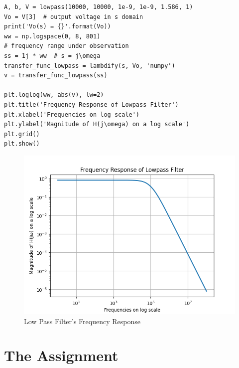 \documentclass[11pt, a4paper]{article}
\begin{document}
\begin{verbatim}
A, b, V = lowpass(10000, 10000, 1e-9, 1e-9, 1.586, 1)
Vo = V[3]  # output voltage in s domain
print('Vo(s) = {}'.format(Vo))
ww = np.logspace(0, 8, 801)  
# frequency range under observation
ss = 1j * ww  # s = j\omega
transfer_func_lowpass = lambdify(s, Vo, 'numpy')  
v = transfer_func_lowpass(ss)  

plt.loglog(ww, abs(v), lw=2)
plt.title('Frequency Response of Lowpass Filter')
plt.xlabel('Frequencies on log scale')
plt.ylabel('Magnitude of H(j\omega) on a log scale')
plt.grid()
plt.show()
\end{verbatim}

  \begin{figure}[!tbh]
   	\centering
  \includegraphics[scale=0.5]{q0.png} 
    \caption{Low Pass Filter's Frequency Response} 	
   \end{figure} 
   
 
\section{The Assignment}  
\end{document}

